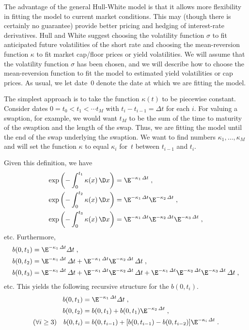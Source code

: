 The advantage of the general Hull-White model is that it allows more flexibility in fitting the model to current market conditions.  This may (though there is certainly no guarantee) provide better pricing and hedging of interest-rate derivatives.  Hull and White suggest choosing the volatility function $\sigma$ to fit anticipated future volatilities of the short rate and choosing the mean-reversion function $\kappa$ to fit market cap/floor prices or yield volatilities.  
We will assume that the volatility function $\sigma$ has been chosen, and we will describe how to choose the mean-reversion function to fit the model to estimated yield volatilities or cap prices.  As usual, we let date~0 denote the date at which we are fitting the model.



The simplest approach is to take the function $\kappa(t)$ to be piecewise constant.  Consider dates $0=t_0 < t_1 < \cdots t_M$ with $t_i-t_{i-1}=\varDelta t$ for each $i$.  For valuing a swaption, for example, we would want $t_M$ to be the sum of the time to maturity of the swaption and the length of the swap.  Thus, we are fitting the model until the end of the swap underlying the swaption.  We want to find numbers $\kappa_1,\ldots,\kappa_M$ and will set the function $\kappa$ to equal $\kappa_i$ for~$t$ between $t_{i-1}$ and $t_i$.

Given this definition, we have
\begin{align*}
\exp\left(-\int_0^{t_1}\kappa(x)\,\D x\right) &= \E^{-\kappa_1\,\varDelta t}\; ,\\
\exp\left(-\int_0^{t_2}\kappa(x)\,\D x\right) &= \E^{-\kappa_1\,\varDelta t}\E^{-\kappa_2\,\varDelta t}\; ,\\
\exp\left(-\int_0^{t_3}\kappa(x)\,\D x\right) &= \E^{-\kappa_1\,\varDelta t}\E^{-\kappa_2\,\varDelta t}\E^{-\kappa_3\,\varDelta t}\;,
\end{align*}
etc.  Furthermore,
\begin{align*}
b(0,t_1) &= \E^{-\kappa_1\,\varDelta t}\varDelta t\; ,\\
b(0,t_2) &= \E^{-\kappa_1\,\varDelta t}\,\varDelta t + \E^{-\kappa_1\,\varDelta t}\E^{-\kappa_2\,\varDelta t}\,\varDelta t\; ,\\
b(0,t_3) &= \E^{-\kappa_1\,\varDelta t}\,\varDelta t + \E^{-\kappa_1\,\varDelta t}\E^{-\kappa_2\,\varDelta t}\,\varDelta t + \E^{-\kappa_1\,\varDelta t}\E^{-\kappa_2\,\varDelta t}\E^{-\kappa_3\,\varDelta t}\,\varDelta t\;,
\end{align*}
etc.
This yields the following recursive structure for the $b(0,t_i)$.
\begin{subequations}\label{generalhwrecursive}
\begin{align}
b(0,t_1) &= \E^{-\kappa_1\,\varDelta t}\varDelta t\; ,\\
b(0,t_2) &= b(0,t_1) + b(0,t_1)\E^{-\kappa_2\,\varDelta t}\; ,\\
(\forall i \geq 3) \quad b(0,t_i) &= b(0,t_{i-1}) + [b(0,t_{i-1})-b(0,t_{i-2})]\E^{-\kappa_i\,\varDelta t}\;.
\end{align}
\end{subequations}

